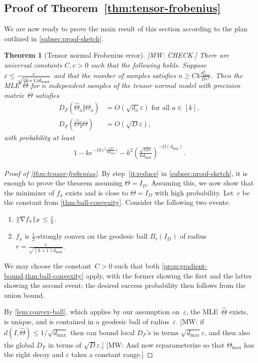 \documentclass[aos]{imsart}
\newtheorem{theorem}{Theorem}[section]
\theoremstyle{definition}
\numberwithin{equation}{section}
\DeclarePairedDelimiter{\norm}{\lVert}{\rVert}
\newcommand{\htheta}{\widehat{\Theta}}
\newcommand{\eps}{\varepsilon}
\newcommand{\rv}{x}
\newcommand{\MW}[1]{{\color{red}[MW: #1]}}
\begin{document}
\subsection{Proof of Theorem~\ref{thm:tensor-frobenius}}
We are now ready to prove the main result of this section according to the plan outlined in \cref{subsec:proof-sketch}.

\clearpage\begin{theorem}[Tensor normal Frobenius error]
\MW{CHECK.}
There are universal constants $C,c>0$ such that the following holds.
Suppose $\eps \leq \smash{\frac c {\sqrt{(k+1)d_{\max}}}}$ and that the number of samples satisfies $n \geq C k \frac{d_{\max}^2}{D \eps^2}$.
Then the MLE~$\htheta$ for $n$ independent samples of the tensor normal model with precision matrix~$\Theta$ satisfies
\begin{align*}
  D_F(\htheta_a\Vert\Theta_a) &= O(\sqrt{d_a} \eps) \text{ for all } a\in[k], \\
  D_F(\htheta\Vert\Theta) &= O(\sqrt D \eps),
\end{align*}
with probability at least
\begin{align*}
  1 - k e^{-\Omega\bigl( \eps^2 \frac{nD}{k d_{\max}} \bigr)} - k^2 \left( \frac{\sqrt{nD}}{k d_{\max}} \right)^{-\Omega(d_{\min})}.
\end{align*}
\end{theorem}

\begin{proof}[Proof of \cref{thm:tensor-frobenius}]
By step~\ref{it:reduce} in \cref{subsec:proof-sketch}, it is enough to prove the theorem assuming $\Theta = I_D$.
Assuming this, we now show that the minimizer of $f_\rv$ exists and is close to $\Theta = I_D$ with high probability.
Let~$c$ be the constant from \cref{thm:ball-convexity}.
Consider the following two events:
\begin{enumerate}
\item\label{it:grad-bd} $\norm{\nabla f_x}_F \leq \frac\eps5$.
\item\label{it:sc-ball} $f_\rv$ is $\frac12$-strongly convex on the geodesic ball $B_r(I_D)$ of radius $r=\frac c{\sqrt{(k+1) d_{\max}}}$.
\end{enumerate}
We may choose the constant~$C>0$ such that both \cref{prop:gradient-bound,thm:ball-convexity} apply, with the former showing the first and the latter showing the second event; the desired success probability then follows from the union bound.

By \cref{lem:convex-ball}, which applies by our assumption on~$\eps$, the MLE~$\htheta$ exists, is unique, and is contained in a geodesic ball of radius~$\eps$.
\MW{if $d(I, \htheta) \leq 1/\sqrt{d_{\max}}$ then can bound local $D_F$'s in terms $\sqrt{d_{\max}}\eps$, and then also the global $D_F$ in terms of $\sqrt D \eps$.}
\MW{And now reparameterize so that $\Theta_{\max}$ has the right decay and $\eps$ takes a constant range.}
\end{proof}
\end{document}
